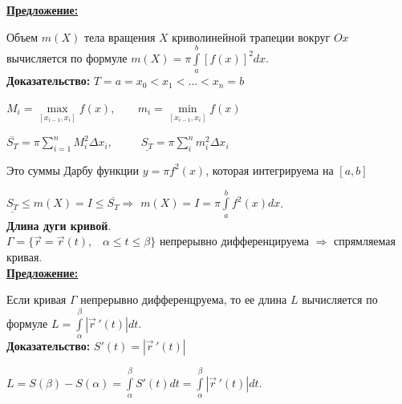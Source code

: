 \documentclass[a4paper,12pt]{article} %
\renewcommand {\leq}{\leqslant}
\begin{document}
\underline{\textbf{Предложение:}}

Объем $m(X)$ тела вращения $X$ криволинейной трапеции вокруг $Ox$ вычисляется по формуле $m(X) = \pi \int\limits_a^b[f(x)]^2dx$.\\

\textbf{Доказательство:} $T={a=x_0<x_1<\dots<x_n = b}$

$M_i = \max \limits_{[x_{i-1}, x_i]} f(x), \;\;\;\;\;\;\; m_i=\min \limits_{[x_{i-1}, x_i]} f(x)$

$\overline{S_T} = \pi \sum\limits_{i=1}^n M_i^2 \Delta x_i, \;\;\;\;\;\;\;\;\; \underline{S_T} = \pi \sum\limits_i^n m_i^2 \Delta x_i$

Это суммы Дарбу функции $y = \pi f^2(x)$, которая интегрируема на $[a, b]$

$\underline{S_T} \leq m(X) = I \leq \overline{S_T} \Rightarrow$ $m(X) = I = \pi \int\limits_a^b f^2(x)dx$.\\

\noindent \textbf{Длина дуги кривой}.\\

$\Gamma = \{\Vec{r} = \Vec{r}(t),\;\;\; \alpha \leq t \leq \beta\}$ непрерывно дифференцируема $\Rightarrow$ спрямляемая кривая.\\

\underline{\textbf{Предложение:}}

Если кривая $\Gamma$ непрерывно дифференцруема, то ее длина $L$ вычисляется по формуле $L=\int\limits_{\alpha}^{\beta} |\Vec{r}\,'(t)|dt$.\\

\textbf{Доказательство:} $S'(t)=|\Vec{r}\,'(t)|$

$L = S(\beta) - S(\alpha) = \int \limits_{\alpha}^{\beta} S'(t)dt = \int \limits_{\alpha}^{\beta} |\Vec{r}\,'(t)| dt$.
\end{document}
